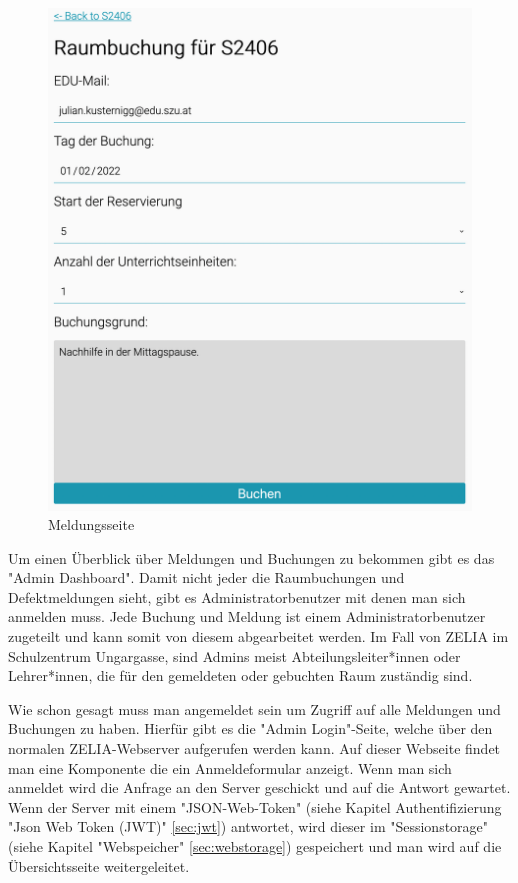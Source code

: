 \begin{figure}[H]
    \centering
    \includegraphics[width=120mm]{media/WebComponents/Buchungsseite_light.png}
    \caption{Meldungsseite}
\end{figure}



Um einen Überblick über Meldungen und Buchungen zu bekommen gibt es das "Admin Dashboard". Damit nicht jeder die Raumbuchungen und Defektmeldungen sieht, gibt es Administratorbenutzer mit denen man sich anmelden muss. Jede Buchung und Meldung ist einem Administratorbenutzer zugeteilt und kann somit von diesem abgearbeitet werden. Im Fall von ZELIA im Schulzentrum Ungargasse, sind Admins meist Abteilungsleiter*innen oder Lehrer*innen, die für den gemeldeten oder gebuchten Raum zuständig sind. 

Wie schon gesagt muss man angemeldet sein um Zugriff auf alle Meldungen und Buchungen zu haben. Hierfür gibt es die "Admin Login"-Seite, welche über den normalen ZELIA-Webserver aufgerufen werden kann. Auf dieser Webseite findet man eine Komponente die ein Anmeldeformular anzeigt. Wenn man sich anmeldet wird die Anfrage an den Server geschickt und auf die Antwort gewartet. Wenn der Server mit einem "JSON-Web-Token" (siehe Kapitel Authentifizierung "Json Web Token (JWT)" \ref{sec:jwt}) antwortet, wird dieser im "Sessionstorage" (siehe Kapitel "Webspeicher" \ref{sec:webstorage}) gespeichert und man wird auf die Übersichtsseite weitergeleitet.

